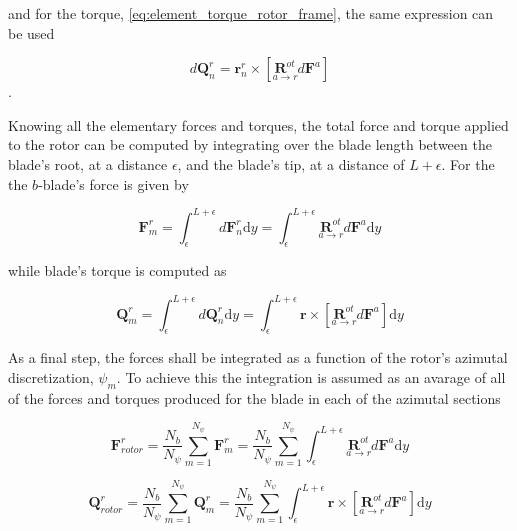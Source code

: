 \noindent and for the torque, \ref{eq:element_torque_rotor_frame}, the same expression can be used

\begin{equation}
    d\mathbf{Q}^r_n = \mathbf{r}^r_n \times \left[ \underset{a \to r}{\boldsymbol{R}^{ot}}  d\mathbf{F}^a \right] 
    \label{eq:element_torque_rotor_frame_simplified}
\end{equation}.

Knowing all the elementary forces and torques, the total force and torque applied to the rotor can be computed by integrating over the blade length between the blade's root, at a distance $\epsilon$, and the blade's tip, at a distance of $L + \epsilon$. For the the $b$-blade's force is given by

\begin{equation}
    \mathbf{F}^r_{m} = \int_\epsilon^{L+\epsilon} d\mathbf{F}^r_n \mathrm{d}y = \int_\epsilon^{L+\epsilon} \underset{a \to r}{\boldsymbol{R}^{ot}}  d\mathbf{F}^a \mathrm{d}y
\end{equation}


\noindent while blade's torque is computed as

\begin{equation}
    \mathbf{Q}^r_{m} = \int_\epsilon^{L+\epsilon} d\mathbf{Q}^r_n  \mathrm{d}y = \int_\epsilon^{L+\epsilon} \mathbf{r} \times \left[ \underset{a \to r}{\boldsymbol{R}^{ot}}  d\mathbf{F}^a \right] \mathrm{d}y
\end{equation}

As a final step, the forces shall be integrated as a function of the rotor's azimutal discretization, $\psi_m$. To achieve this the integration is assumed as an avarage of all of the forces and torques produced for the blade in each of the azimutal sections

\begin{equation}
    \mathbf{F}_{rotor}^r = \frac{N_b }{N_{\psi}} \sum_{m=1}^{N_{\psi}} \mathbf{F}^r_{m} = \frac{N_b }{N_{\psi}} \sum_{m=1}^{N_{\psi}} \int_\epsilon^{L+\epsilon} \underset{a \to r}{\boldsymbol{R}^{ot}}  d\mathbf{F}^a \mathrm{d}y
    \label{eq:total_rotor_force_rotor_frame}
\end{equation}

\begin{equation}
    \mathbf{Q}_{rotor}^r = \frac{N_b }{N_{\psi}} \sum_{m=1}^{N_{\psi}} \mathbf{Q}^r_{m} = \frac{N_b }{N_{\psi}} \sum_{m=1}^{N_{\psi}} \int_\epsilon^{L+\epsilon} \mathbf{r} \times \left[ \underset{a \to r}{\boldsymbol{R}^{ot}}  d\mathbf{F}^a \right] \mathrm{d}y
    \label{eq:total_rotor_torque_rotor_frame}
\end{equation}

